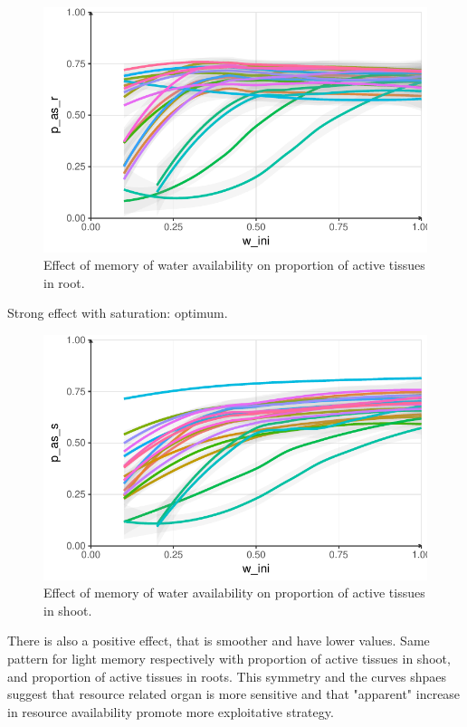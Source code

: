 \begin{figure}\label{fig:w_ini_p_as_r}
\includegraphics[width = \textwidth]{./2_PP/Figures/w_ini_p_as_r.pdf}
\caption{Effect of memory of water availability on proportion of active tissues in root.}
\end{figure}

Strong effect with saturation: optimum. 

\begin{figure}\label{fig:w_ini_p_as_s}
\includegraphics[width = \textwidth]{./2_PP/Figures/w_ini_p_as_s.pdf}
\caption{Effect of memory of water availability on proportion of active tissues in shoot.}
\end{figure}
There is also a positive effect, that is smoother and have lower values. Same pattern for light memory respectively with proportion of active tissues in shoot, and proportion of active tissues in roots. This symmetry and the curves shpaes suggest that resource related organ is more sensitive and that "apparent" increase in resource availability promote more exploitative strategy.\\

